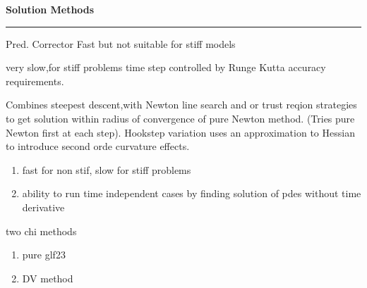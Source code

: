      \begin{slide}          \setlength{\topmargin}{-0.5in}
       \begin{center}
           \Large\bfseries Solution Methods%

        \end{center}
        \normalsize  

        \bigskip
        \hrule height4pt
        \begin{description}
          \bfseries \tiny
           \item {Pred. Corrector} Fast but not suitable for stiff
           models
           \item[Adaptive Method Lines] very slow,for stiff
             problems time step
             controlled by Runge Kutta accuracy requirements.
             \item[Globally Convergent Newton Based methods]
               Combines 
               steepest descent,with Newton line search and
               or trust reqion strategies to get solution within
               radius of convergence of pure Newton method. (Tries
               pure Newton first at each step). Hookstep variation
               uses an approximation to Hessian to introduce second
               orde curvature effects.
               \begin{enumerate}
                 \item fast for non stif, slow for stiff problems
                 \item ability to run time independent cases by
                   finding solution of pdes without time derivative
               \end{enumerate}
             \item{two chi methods}
               \begin{enumerate}
                 \item pure glf23
                 \item DV method 
                \end{enumerate}
    \end{description}
    \end{slide}

 
  